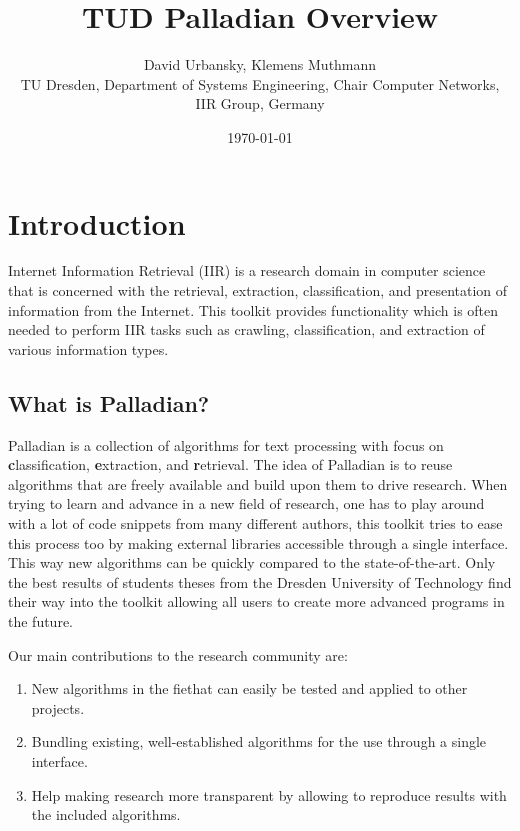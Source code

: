\documentclass[a4paper,twoside]{book}      %
\date{\today}
\title{TUD Palladian Overview}
\author{David Urbansky, Klemens Muthmann \\
{\small TU Dresden, Department of Systems Engineering, Chair Computer Networks, IIR Group, Germany}
}
\begin{document}
\maketitle

\tableofcontents

\chapter{Introduction}
Internet Information Retrieval (IIR) is a research domain in computer science that is concerned with the retrieval, extraction, classification, and presentation of information from the Internet. This toolkit provides functionality which is often needed to perform IIR tasks such as crawling, classification, and extraction of various information types.

\section{What is Palladian?}
Palladian is a collection of algorithms for text processing with focus on {\textbf classification}, {\textbf extraction}, and {\textbf retrieval}. The idea of Palladian is to reuse algorithms that are freely available and build upon them to drive research. When trying to learn and advance in a new field of research, one has to play around with a lot of code snippets from many different authors, this toolkit tries to ease this process too by making external libraries accessible through a single interface. This way new algorithms can be quickly compared to the state-of-the-art.
Only the best results of students theses from the Dresden University of Technology find their way into the toolkit allowing all users to create more advanced programs in the future.

Our main contributions to the research community are:
\begin{enumerate}
\item New algorithms in the fiethat can easily be tested and applied to other projects.
\item Bundling existing, well-established algorithms for the use through a single interface.
\item Help making research more transparent by allowing to reproduce results with the included algorithms.
\end{enumerate}
\end{document}
